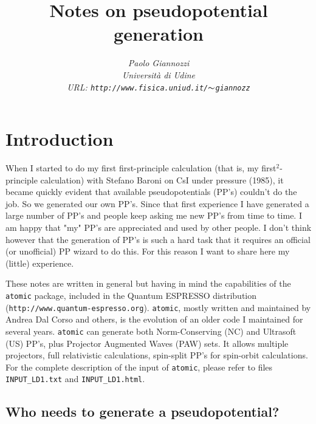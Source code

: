 \documentclass[12pt,a4paper]{article}
\begin{document}
 
\title{Notes on pseudopotential generation}
\author{\em Paolo Giannozzi\\
Universit\`a di Udine\\
URL: {\tt http://www.fisica.uniud.it/$\thicksim$giannozz}}
\maketitle
\date
\tableofcontents

\section{Introduction} 

When I started to do my first first-principle calculation
(that is, my first$^2$-principle calculation) with Stefano Baroni
on CsI under pressure (1985), it became quickly evident that
available pseudopotentials (PP's) couldn't do the job. So we 
generated our own PP's. Since that first experience I have 
generated a large number of PP's and people keep asking me 
new PP's from time to time. I am happy that "my" PP's are 
appreciated and used by other people. I don't think however 
that the generation of PP's is such a hard task that it requires 
an official (or unofficial) PP wizard to do this. For this reason 
I want to share here my (little) experience.

These notes are written in general but having in mind the capabilities of
the {\tt atomic} package, included in the {\sc Quantum ESPRESSO} 
distribution 
(\texttt{http://www.quantum-espresso.org}). {\tt atomic}, mostly written
and maintained by Andrea Dal Corso and others, is the evolution of 
an older code I maintained for several years. {\tt atomic} can generate 
both Norm-Conserving (NC) \cite{NC} and Ultrasoft (US) \cite{van} PP's,
plus Projector Augmented Waves (PAW) \cite{PAW} sets.
It allows multiple projectors, full relativistic calculations,
spin-split PP's for spin-orbit calculations.
For the complete description of the input of \texttt{atomic},
please refer to files \texttt{INPUT\_LD1.txt} and 
\texttt{INPUT\_LD1.html}.

\subsection{Who needs to generate a pseudopotential?}
\end{document}
